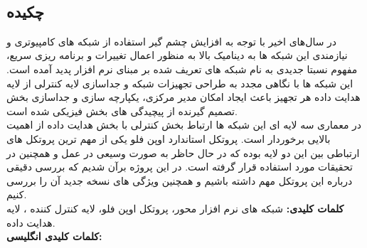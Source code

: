 
\setcounter{page}{1}
\thispagestyle{empty}

~\vfill

\subsection*{چکیده}
\begin{small}
\baselineskip=0.7cm

در سال‌های اخیر با توجه به افزایش چشم گیر استفاده از شبکه های کامپیوتری و نیازمندی این شبکه ها به دینامیک بالا به منظور اعمال تغییرات و برنامه ریزی سریع، مفهوم نسبتا جدیدی به نام شبکه های تعریف شده بر مبنای نرم افزار  پدید آمده است. این شبکه ها با نگاهی مجدد به طراحی تجهیزات شبکه و جداسازی لایه کنترلی  از لایه هدایت داده  هر تجهیز باعث ایجاد امکان مدیر مرکزی، یکپارچه سازی و جداسازی بخش تصمیم گیرنده از پیچیدگی های بخش فیزیکی شده است.\\
در معماری سه لایه ای این شبکه ها ارتباط بخش کنترلی با بخش هدایت داده از اهمیت بالایی برخوردار است. پروتکل استاندارد اوپن فلو  یکی از مهم ترین پروتکل های ارتباطی بین این دو لایه بوده که در حال حاظر به صورت وسیعی در عمل و همچنین در تحقیقات مورد استفاده قرار گرفته است. در این پروژه برآن شدیم که بررسی دقیقی درباره این پروتکل مهم داشته باشیم و همچنین ویژگی های نسخه جدید آن را بررسی کنیم.\\

\noindent\textbf{کلمات کلیدی:} شبکه های نرم افزار محور، پروتکل اوپن فلو، لایه کنترل کننده ، لایه هدایت داده. \\
\noindent\textbf{کلمات کلیدی انگلیسی:} 
\\

\end{small}